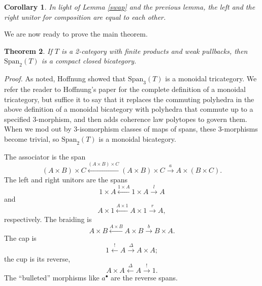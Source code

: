 \documentclass[12pt,twoside,openright]{report}
\newtheorem{thm}{Theorem}
\newcommand{\Span}{\mbox{Span}}
\newtheorem{cor}[thm]{Corollary}
\begin{document}
\begin{cor}
  In light of Lemma \ref{swap} and the previous lemma, the left and the right unitor for composition are equal to each other.
\end{cor}

We are now ready to prove the main theorem.

\begin{thm}
  \label{Span2}
  If $T$ is a 2-category with finite products and weak pullbacks, then $\Span_2(T)$ is a compact closed bicategory.
\end{thm}
{\em Proof.} As noted, Hoffnung \cite{Hoffnung} showed that $\Span_3(T)$
is a monoidal tricategory.  We refer the reader to Hoffnung's paper for the complete definition of a monoidal tricategory, but suffice it to say that it replaces the commuting polyhedra in the above definition of a monoidal bicategory with polyhedra that commute up to a specified 3-morphism, and then adds coherence law polytopes to govern them.  When we mod out by 3-isomorphism classes of maps of spans, these 3-morphisms become trivial, so $\Span_2(T)$ is a monoidal bicategory.

The associator is the span $$(A\times B)\times C \stackrel{(A\times B)\times C}{\leftarrow} (A\times B)\times C \stackrel{a}{\to} A\times (B\times C).$$  The left and right unitors are the spans $$1\times A \stackrel{1\times A}{\leftarrow} 1\times A \stackrel{l}{\to} A$$ and $$A\times 1 \stackrel{A\times 1}{\leftarrow} A\times 1 \stackrel{r}{\to} A,$$ respectively.  The braiding is $$A\times B \stackrel{A\times B}{\leftarrow} A\times B \stackrel{b}{\to} B\times A.$$   The cap is $$1 \stackrel{!}{\leftarrow} A \stackrel{\Delta}{\to} A\times A;$$ the cup is its reverse, $$A\times A \stackrel{\Delta}{\leftarrow} A \stackrel{!}{\to} 1.$$  The ``bulleted'' morphisms like $a^\bullet$ are the reverse spans.
\end{document}
